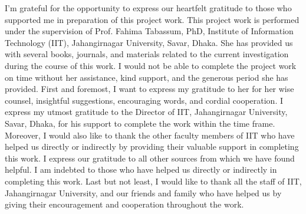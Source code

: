I’m grateful for the opportunity to express our heartfelt gratitude to those who supported me in preparation of this project work.
This project work is performed under the supervision of Prof. Fahima Tabassum, PhD, Institute of Information Technology (IIT), Jahangirnagar University, Savar, Dhaka. She has provided us with several books, journals, and materials related to the current investigation during the course of this work. I would not be able to complete the project work on time without her assistance, kind support, and the generous period she has provided. First and foremost, I want to express my gratitude to her for her wise counsel, insightful suggestions, encouraging words, and cordial cooperation.
I express my utmost gratitude to the Director of IIT, Jahangirnagar University, Savar, Dhaka, for his support to complete the work within the time frame. Moreover, I would also like to thank the other faculty members of IIT who have helped us directly or indirectly by providing their valuable support in completing this work.
I express our gratitude to all other sources from which we have found helpful. I am indebted to those who have helped us directly or indirectly in completing this work.
Last but not least, I would like to thank all the staff of IIT, Jahangirnagar University, and our friends and family who have helped us by giving their encouragement and cooperation throughout the work.

